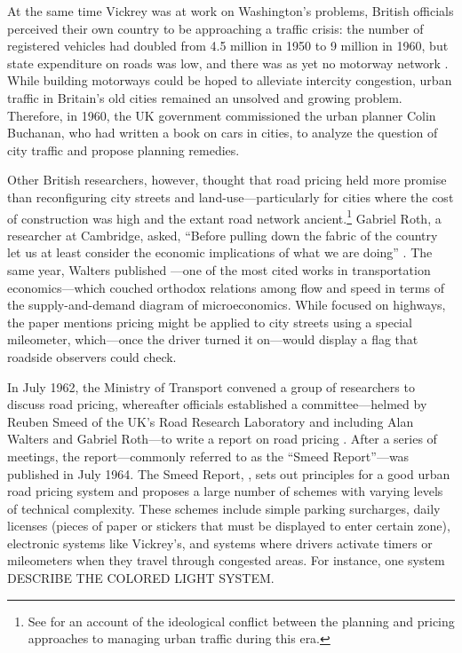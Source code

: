 At the same time Vickrey was at work on Washington's problems, British officials perceived their own country to be approaching a traffic crisis: the number of registered vehicles had doubled from 4.5 million in 1950 to 9 million in 1960, but state expenditure on roads was low, and there was as yet no motorway network \citep[p.523-524]{Gunn2011}. While building motorways could be hoped to alleviate intercity congestion, urban traffic in Britain's old cities remained an unsolved and growing problem. Therefore, in 1960, the UK government commissioned the urban planner Colin Buchanan, who had written a book on cars in cities, to analyze the question of city traffic and propose planning remedies. 

Other British researchers, however, thought that road pricing held more promise than reconfiguring city streets and land-use---particularly for cities where the cost of construction was high and the extant road network ancient.\footnote{See \citep{Rooney2014} for an account of the ideological conflict between the planning and pricing approaches to managing urban traffic during this era.} Gabriel Roth, a researcher at Cambridge, asked, ``Before pulling down the fabric of the country let us at least consider the economic implications of what we are doing'' \citep[p.289]{Roth1961}. The same year, Walters published \citet{Walters1961}---one of the most cited works in transportation economics---which couched orthodox relations among flow and speed in terms of the supply-and-demand diagram of microeconomics. While focused on highways, the paper mentions pricing might be applied to city streets using a special mileometer, which---once the driver turned it on---would display a flag that roadside observers could check.

In July 1962, the Ministry of Transport convened a group of researchers to discuss road pricing, whereafter officials established a committee---helmed by Reuben Smeed of the UK's Road Research Laboratory and including Alan Walters and Gabriel Roth---to write a report on road pricing \citep{Rooney2014}. After a series of meetings, the report---commonly referred to as the ``Smeed Report''---was published in July 1964. The Smeed Report, \citet{MoT1964}, sets out principles for a good urban road pricing system and proposes a large number of schemes with varying levels of technical complexity. These schemes include simple parking surcharges, daily licenses (pieces of paper or stickers that must be displayed to enter certain zone), electronic systems like Vickrey's, and systems where drivers activate timers or mileometers when they travel through congested areas. For instance, one system DESCRIBE THE COLORED LIGHT SYSTEM.


